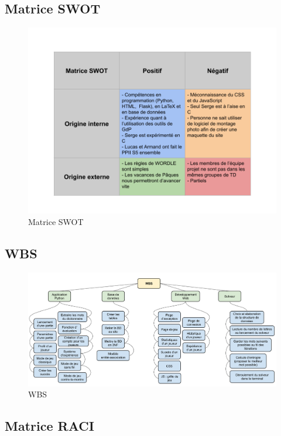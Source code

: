\subsection*{Matrice SWOT}

\begin{figure}[h!]
    \centering
    \includegraphics[width=16cm]{figures/SWOT.png}
    \caption{Matrice SWOT}
\end{figure}
\newpage
\subsection*{WBS}

\begin{figure}[h!]
    \centering
    \includegraphics[width=16cm]{figures/WBS.png}
    \caption{WBS}
\end{figure}

\newpage
\subsection*{Matrice RACI}

